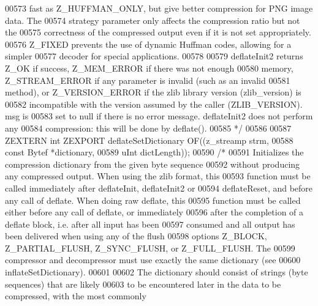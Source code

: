 \begin{DoxyCode}
00573 \textcolor{comment}{   fast as Z\_HUFFMAN\_ONLY, but give better compression for PNG image data.  The}
00574 \textcolor{comment}{   strategy parameter only affects the compression ratio but not the}
00575 \textcolor{comment}{   correctness of the compressed output even if it is not set appropriately.}
00576 \textcolor{comment}{   Z\_FIXED prevents the use of dynamic Huffman codes, allowing for a simpler}
00577 \textcolor{comment}{   decoder for special applications.}
00578 \textcolor{comment}{}
00579 \textcolor{comment}{     deflateInit2 returns Z\_OK if success, Z\_MEM\_ERROR if there was not enough}
00580 \textcolor{comment}{   memory, Z\_STREAM\_ERROR if any parameter is invalid (such as an invalid}
00581 \textcolor{comment}{   method), or Z\_VERSION\_ERROR if the zlib library version (zlib\_version) is}
00582 \textcolor{comment}{   incompatible with the version assumed by the caller (ZLIB\_VERSION).  msg is}
00583 \textcolor{comment}{   set to null if there is no error message.  deflateInit2 does not perform any}
00584 \textcolor{comment}{   compression: this will be done by deflate().}
00585 \textcolor{comment}{*/}
00586 
00587 ZEXTERN \textcolor{keywordtype}{int} ZEXPORT deflateSetDictionary OF((z\_streamp strm,
00588                                              \textcolor{keyword}{const} Bytef *dictionary,
00589                                              uInt  dictLength));
00590 \textcolor{comment}{/*}
00591 \textcolor{comment}{     Initializes the compression dictionary from the given byte sequence}
00592 \textcolor{comment}{   without producing any compressed output.  When using the zlib format, this}
00593 \textcolor{comment}{   function must be called immediately after deflateInit, deflateInit2 or}
00594 \textcolor{comment}{   deflateReset, and before any call of deflate.  When doing raw deflate, this}
00595 \textcolor{comment}{   function must be called either before any call of deflate, or immediately}
00596 \textcolor{comment}{   after the completion of a deflate block, i.e. after all input has been}
00597 \textcolor{comment}{   consumed and all output has been delivered when using any of the flush}
00598 \textcolor{comment}{   options Z\_BLOCK, Z\_PARTIAL\_FLUSH, Z\_SYNC\_FLUSH, or Z\_FULL\_FLUSH.  The}
00599 \textcolor{comment}{   compressor and decompressor must use exactly the same dictionary (see}
00600 \textcolor{comment}{   inflateSetDictionary).}
00601 \textcolor{comment}{}
00602 \textcolor{comment}{     The dictionary should consist of strings (byte sequences) that are likely}
00603 \textcolor{comment}{   to be encountered later in the data to be compressed, with the most commonly}

\end{DoxyCode}
